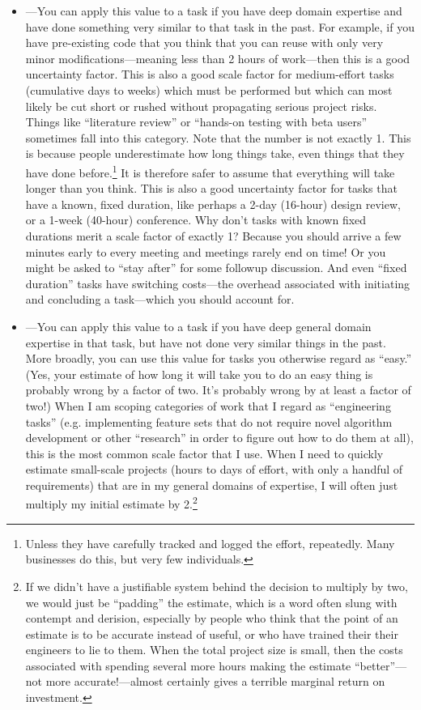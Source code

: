 \documentclass[12pt,oneside]{book}
\begin{document}
\begin{itemize}[wide, labelwidth=!, labelindent=0pt, font=\bfseries]
\item[1.2]---You can apply this value to a task if you have deep domain expertise and have done something very similar to that task in the past. For example, if you have pre-existing code that you think that you can reuse with only very minor modifications---meaning less than 2 hours of work---then this is a good uncertainty factor. This is also a good scale factor for medium-effort tasks (cumulative days to weeks) which must be performed but which can most likely be cut short or rushed without propagating serious project risks. Things like ``literature review'' or ``hands-on testing with beta users'' sometimes fall into this category.
Note that the number is not exactly 1. This is because people underestimate how long things take, even things that they have done before.\footnote{
Unless they have carefully tracked and logged the effort, repeatedly. Many businesses do this, but very few individuals.}
It is therefore safer to assume that everything will take longer than you think. This is also a good uncertainty factor for tasks that have a known, fixed duration, like perhaps a 2-day (16-hour) design review, or a 1-week (40-hour) conference. Why don't tasks with known fixed durations merit a scale factor of exactly 1? Because you should arrive a few minutes early to every meeting and meetings rarely end on time! Or you might be asked to ``stay after'' for some followup discussion. And even ``fixed duration'' tasks have switching costs---the overhead associated with initiating and concluding a task---which you should account for.

\item[2]---You can apply this value to a task if you have deep general domain expertise in that task, but have not done very similar things in the past. More broadly, you can use this value for tasks you otherwise regard as ``easy.'' (Yes, your estimate of how long it will take you to do an easy thing is probably wrong by a factor of two. It's probably wrong by at least a factor of two!) When I am scoping categories of work that I regard as ``engineering tasks'' (e.g. implementing feature sets that do not require novel algorithm development or other ``research'' in order to figure out how to do them at all), this is the most common scale factor that I use. When I need to quickly estimate small-scale projects (hours to days of effort, with only a handful of requirements) that are in my general domains of expertise, I will often just multiply my initial estimate by 2.\footnote{If we didn't have a justifiable system behind the decision to multiply by two, we would just be ``padding'' the estimate, which is a word often slung with contempt and derision, especially by people who think that the point of an estimate is to be accurate instead of useful, or who have trained their their engineers to lie to them. When the total project size is small, then the costs associated with spending several more hours making the estimate ``better''---not more accurate!---almost certainly gives a terrible marginal return on investment.}


\end{itemize}
\end{document}
